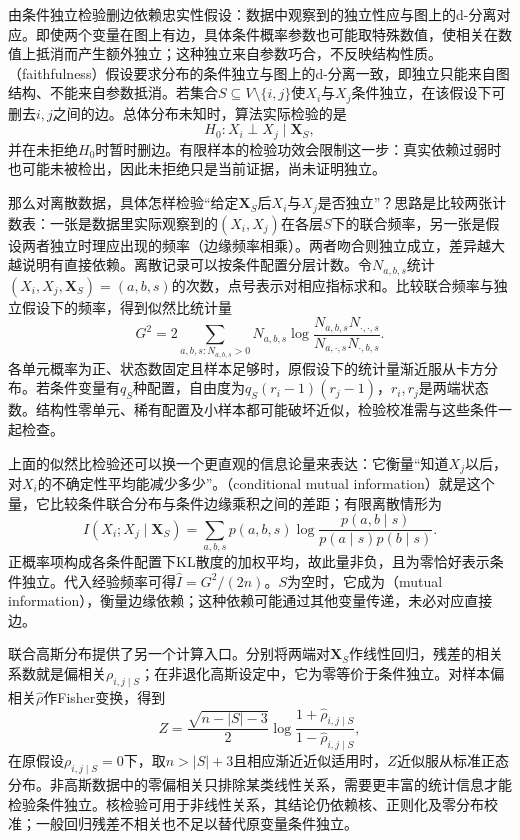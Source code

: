 由条件独立检验删边依赖忠实性假设：数据中观察到的独立性应与图上的d-分离对应。即使两个变量在图上有边，具体条件概率参数也可能取特殊数值，使相关在数值上抵消而产生额外独立；这种独立来自参数巧合，不反映结构性质。（faithfulness）假设要求分布的条件独立与图上的d-分离一致，即独立只能来自图结构、不能来自参数抵消。若集合$S\subseteq V\setminus\{i,j\}$使$X_i$与$X_j$条件独立，在该假设下可删去$i,j$之间的边。总体分布未知时，算法实际检验的是
\[
  H_0:X_i\perp X_j\mid\bm{X}_S,
\]
并在未拒绝$H_0$时暂时删边。有限样本的检验功效会限制这一步：真实依赖过弱时也可能未被检出，因此未拒绝只是当前证据，尚未证明独立。

那么对离散数据，具体怎样检验“给定$\bm X_S$后$X_i$与$X_j$是否独立”？思路是比较两张计数表：一张是数据里实际观察到的$(X_i,X_j)$在各层$S$下的联合频率，另一张是假设两者独立时理应出现的频率（边缘频率相乘）。两者吻合则独立成立，差异越大越说明有直接依赖。离散记录可以按条件配置分层计数。令$N_{a,b,s}$统计$(X_i,X_j,\bm{X}_S)=(a,b,s)$的次数，点号表示对相应指标求和。比较联合频率与独立假设下的频率，得到似然比统计量
\begin{equation}
  G^2=2\sum_{a,b,s:N_{a,b,s}>0}
  N_{a,b,s}\log
  \frac{N_{a,b,s}N_{\cdot,\cdot,s}}
       {N_{a,\cdot,s}N_{\cdot,b,s}}.
  \label{eq:pgm-structure-learning-g-test}
\end{equation}
各单元概率为正、状态数固定且样本足够时，原假设下的统计量渐近服从卡方分布。若条件变量有$q_S$种配置，自由度为$q_S(r_i-1)(r_j-1)$，$r_i,r_j$是两端状态数。结构性零单元、稀有配置及小样本都可能破坏近似，检验校准需与这些条件一起检查。

上面的似然比检验还可以换一个更直观的信息论量来表达：它衡量“知道$X_j$以后，对$X_i$的不确定性平均能减少多少”。（conditional mutual information）就是这个量，它比较条件联合分布与条件边缘乘积之间的差距；有限离散情形为
\[
  I(X_i;X_j\mid\bm{X}_S)
  =\sum_{a,b,s}p(a,b,s)
       \log\frac{p(a,b\mid s)}{p(a\mid s)p(b\mid s)}.
\]
正概率项构成各条件配置下KL散度的加权平均，故此量非负，且为零恰好表示条件独立。代入经验频率可得$\widehat I=G^2/(2n)$。$S$为空时，它成为（mutual information），衡量边缘依赖；这种依赖可能通过其他变量传递，未必对应直接边。

联合高斯分布提供了另一个计算入口。分别将两端对$\bm{X}_S$作线性回归，残差的相关系数就是偏相关$\rho_{i,j\mid S}$；在非退化高斯设定中，它为零等价于条件独立。对样本偏相关$\widehat\rho$作Fisher变换，得到
\[
  Z=\frac{\sqrt{n-|S|-3}}{2}
    \log\frac{1+\widehat\rho_{i,j\mid S}}
                  {1-\widehat\rho_{i,j\mid S}},
\]
在原假设$\rho_{i,j\mid S}=0$下，取$n>|S|+3$且相应渐近近似适用时，$Z$近似服从标准正态分布。非高斯数据中的零偏相关只排除某类线性关系，需要更丰富的统计信息才能检验条件独立。核检验可用于非线性关系，其结论仍依赖核、正则化及零分布校准；一般回归残差不相关也不足以替代原变量条件独立。

